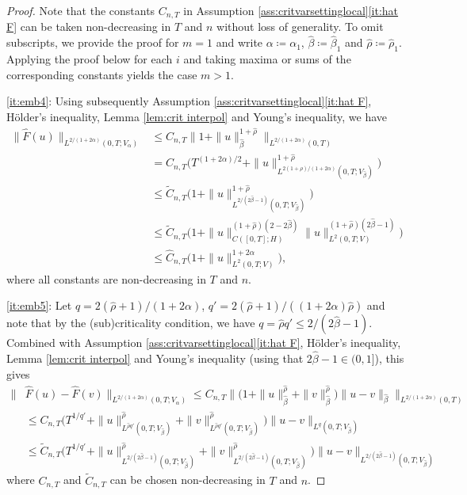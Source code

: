 \documentclass[10pt,a4paper]{amsart}
\newcommand{\<}{\langle}
\newcommand{\?}{\rangle}
\newcommand{\ceqq}{\coloneqq}
\theoremstyle{plain}
\begin{document}
\begin{proof}
Note that the constants $C_{n,T}$ in Assumption \ref{ass:critvarsettinglocal}\ref{it:hat F} can be taken non-decreasing in $T$ and $n$ without loss of generality. To omit subscripts, we provide the proof for $m=1$ and write $\alpha\ceqq \alpha_1$, $\hat{\beta}\ceqq\hat{\beta}_1$ and $\hat{\rho}\ceqq\hat{\rho}_1$. Applying the proof below for each $i$ and taking maxima or sums of the corresponding constants yields the case $m>1$. 
 
\ref{it:emb4}: Using subsequently Assumption \ref{ass:critvarsettinglocal}\ref{it:hat F}, H\"older's inequality, Lemma \ref{lem:crit interpol} and Young's inequality, we have
\begin{align*}
  \|\hat{F}(u)\|_{L^{2/(1+2\alpha)}(0,T;V_{\alpha})} 
  &\leq  C_{n,T} \big\|1+\|u\|_{\hat{\beta}}^{1+\hat{\rho}} \big\|_{L^{2/(1+2\alpha)}(0,T)} \\
   &=  {C}_{n,T}\big(T^{(1+2\alpha)/2}+\|u\|_{L^{2(1+\hat{\rho})/(1+2\alpha)}(0,T;V_{\hat{\beta}})}^{1+\hat{\rho}} \big)\\
   &\leq  \tilde{C}_{n,T}\big(1+\|u\|_{L^{2/(2\hat{\beta}-1)}(0,T;V_{\hat{\beta}})}^{1+\hat{\rho}} \big)\\
&\leq  \tilde{C}_{n,T}\big(1+\|u\|_{C([0,T];H)}^{(1+\hat{\rho})(2-2\hat{\beta})} \|u\|_{L^2(0,T;V)}^{(1+\hat{\rho})(2\hat{\beta}-1)} \big)\\
&\leq  \hat{C}_{n,T}\big(1+  \|u\|_{L^2(0,T;V)}^{1+2\alpha} \big),   
\end{align*}
where all constants are non-decreasing in $T$ and $n$. 
 
\ref{it:emb5}: 
Let $q=2(\hat{\rho}+1)/(1+2\alpha)$, $q' =2(\hat{\rho}+1)/((1+2\alpha)\hat{\rho})$ and note that by the (sub)criticality condition, we have $q=\hat{\rho}q'\leq {2}/({2\hat{\beta}-1})$. Combined with Assumption \ref{ass:critvarsettinglocal}\ref{it:hat F}, H\"older's inequality, Lemma \ref{lem:crit interpol} and Young's inequality (using that $2\hat{\beta}-1\in(0,1]$), this gives
\begin{align*}
\|&\hat{F}(u)-\hat{F}(v)\|_{L^{2/(1+2\alpha)}(0,T;V_{\alpha})}\leq C_{n,T} \big\|\big(1+\|u\|_{\hat{\beta}}^{\hat{\rho}}+\|v\|_{\hat{\beta}}^{ \hat{\rho}}\big)\|u-v\|_{\hat{\beta}} \big\|_{L^{2/(1+2\alpha)}(0,T)} \\
&\leq {C}_{n,T} \Big(T^{1/q'}+\|u\|_{L^{\hat{\rho}q'}(0,T;V_{\hat{\beta}})}^{\hat{\rho}}+\|v\|_{L^{\hat{\rho}q'}(0,T;V_{\hat{\beta}})}^{ \hat{\rho}}\Big)\|u-v\|_{L^{q}(0,T;V_{\hat{\beta}})}\\
&\leq \tilde{C}_{n,T} \Big(T^{1/q'}+\|u\|_{L^{{2}/({2\hat{\beta}-1})}(0,T;V_{\hat{\beta}})}^{\hat{\rho}}+\|v\|_{L^{{2}/({2\hat{\beta}-1})}(0,T;V_{\hat{\beta}})}^{ \hat{\rho}}\Big)\|u-v\|_{L^{{2}/({2\hat{\beta}-1})}(0,T;V_{\hat{\beta}})} 
\end{align*} 
where $C_{n,T}$ and $\tilde{C}_{n,T}$ can be chosen non-decreasing in $T$ and $n$. 


\end{proof}
\end{document}
